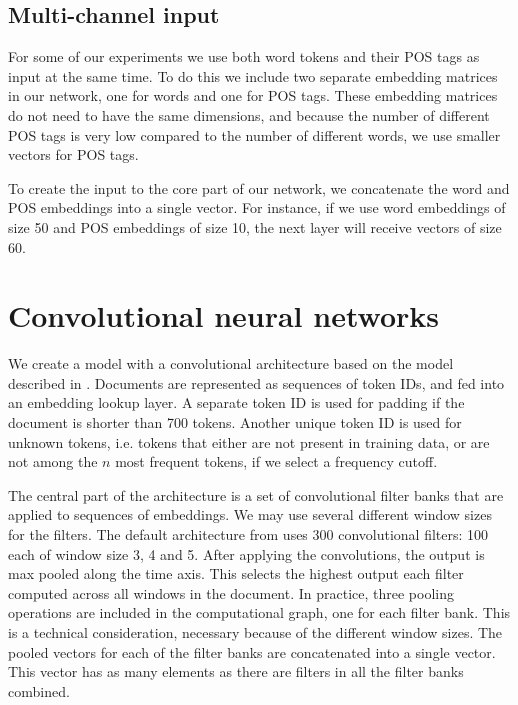 \subsection{Multi-channel input}

For some of our experiments we use both word tokens and their POS tags as
input at the same time. To do this we include two separate embedding matrices
in our network, one for words and one for POS tags. These embedding matrices
do not need to have the same dimensions, and because the number of
different POS tags is very low compared to the number of different words, we
use smaller vectors for POS tags.

To create the input to the core part of our network, we concatenate the word
and POS embeddings into a single vector. For instance, if we use word
embeddings of size 50 and POS embeddings of size 10, the next layer will
receive vectors of size 60.


\section{Convolutional neural networks}

We create a model with a convolutional architecture based on the model
described in \textcite{kim2014convolutional}. Documents are represented as
sequences of token IDs, and fed into an embedding lookup layer. A separate
token ID is used for padding if the document is shorter than 700 tokens.
Another unique token ID is used for unknown tokens, i.e. tokens that either
are not present in training data, or are not among the $n$ most frequent
tokens, if we select a frequency cutoff.

The central part of the architecture is a set of convolutional filter banks
that are applied to sequences of embeddings. We may use several different
window sizes for the filters. The default architecture from
\textcite{kim2014convolutional} uses 300 convolutional filters: 100 each of
window size 3, 4 and 5. After applying the convolutions, the output is max
pooled along the time axis. This selects the highest output each filter
computed across all windows in the document. In practice, three pooling
operations are included in the computational graph, one for each filter bank.
This is a technical consideration, necessary because of the different window
sizes. The pooled vectors for each of the filter banks are concatenated into
a single vector. This vector has as many elements as there are filters in all
the filter banks combined.

